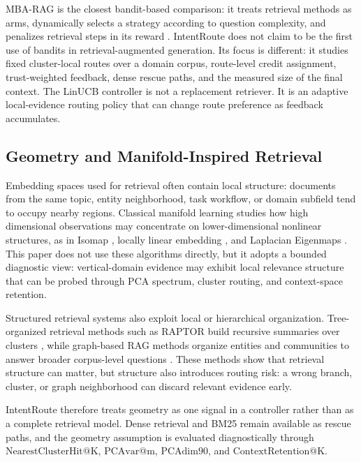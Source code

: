 MBA-RAG is the closest bandit-based comparison: it treats retrieval methods as arms, dynamically selects a strategy according to question complexity, and penalizes retrieval steps in its reward \citep{tang2025mbarag}. IntentRoute does not claim to be the first use of bandits in retrieval-augmented generation. Its focus is different: it studies fixed cluster-local routes over a domain corpus, route-level credit assignment, trust-weighted feedback, dense rescue paths, and the measured size of the final context. The LinUCB controller is not a replacement retriever. It is an adaptive local-evidence routing policy that can change route preference as feedback accumulates.

\subsection{Geometry and Manifold-Inspired Retrieval}
\label{sec:03-related-work:geometry-and-manifold-inspired-retrieval}

Embedding spaces used for retrieval often contain local structure: documents from the same topic, entity neighborhood, task workflow, or domain subfield tend to occupy nearby regions. Classical manifold learning studies how high dimensional observations may concentrate on lower-dimensional nonlinear structures, as in Isomap \citep{tenenbaum2000isomap}, locally linear embedding \citep{roweis2000lle}, and Laplacian Eigenmaps \citep{belkin2003laplacian}. This paper does not use these algorithms directly, but it adopts a bounded diagnostic view: vertical-domain evidence may exhibit local relevance structure that can be probed through PCA spectrum, cluster routing, and context-space retention.

Structured retrieval systems also exploit local or hierarchical organization. Tree-organized retrieval methods such as RAPTOR build recursive summaries over clusters \citep{sarthi2024raptor}, while graph-based RAG methods organize entities and communities to answer broader corpus-level questions \citep{edge2024graphrag}. These methods show that retrieval structure can matter, but structure also introduces routing risk: a wrong branch, cluster, or graph neighborhood can discard relevant evidence early.

IntentRoute therefore treats geometry as one signal in a controller rather than as a complete retrieval model. Dense retrieval and BM25 remain available as rescue paths, and the geometry assumption is evaluated diagnostically through $\mathrm{NearestClusterHit@K}$, $\mathrm{PCAvar@m}$, $\mathrm{PCAdim90}$, and $\mathrm{ContextRetention@K}$.

